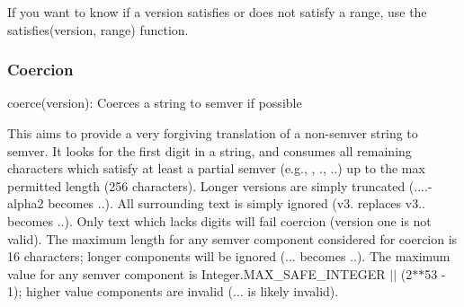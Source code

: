 If you want to know if a version satisfies or does not satisfy a range, use the {\ttfamily satisfies(version, range)} function.

\subsubsection*{Coercion}


\begin{DoxyItemize}
\item {\ttfamily coerce(version)}\+: Coerces a string to semver if possible
\end{DoxyItemize}

This aims to provide a very forgiving translation of a non-\/semver string to semver. It looks for the first digit in a string, and consumes all remaining characters which satisfy at least a partial semver (e.\+g., {}, {.}, {..}) up to the max permitted length (256 characters). Longer versions are simply truncated ({....-\/alpha2} becomes {..}). All surrounding text is simply ignored ({\ttfamily v3. replaces v3..} becomes {..}). Only text which lacks digits will fail coercion ({\ttfamily version one} is not valid). The maximum length for any semver component considered for coercion is 16 characters; longer components will be ignored ({...} becomes {..}). The maximum value for any semver component is {\ttfamily Integer.\+M\+A\+X\+\_\+\+S\+A\+F\+E\+\_\+\+I\+N\+T\+E\+G\+ER $\vert$$\vert$ (2$\ast$$\ast$53 -\/ 1)}; higher value components are invalid ({...} is likely invalid). 
